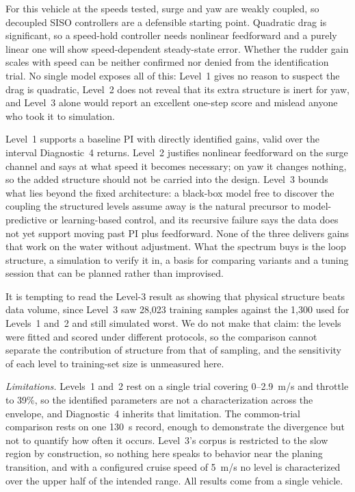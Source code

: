 \documentclass[conference]{IEEEtran}
\begin{document}
For this vehicle at the speeds tested, surge and yaw are weakly coupled, so decoupled SISO controllers are a defensible starting point. Quadratic drag is significant, so a speed-hold controller needs nonlinear feedforward and a purely linear one will show speed-dependent steady-state error. Whether the rudder gain scales with speed can be neither confirmed nor denied from the identification trial. No single model exposes all of this: Level~1 gives no reason to suspect the drag is quadratic, Level~2 does not reveal that its extra structure is inert for yaw, and Level~3 alone would report an excellent one-step score and mislead anyone who took it to simulation.

Level~1 supports a baseline PI with directly identified gains, valid over the interval Diagnostic~4 returns. Level~2 justifies nonlinear feedforward on the surge channel and says at what speed it becomes necessary; on yaw it changes nothing, so the added structure should not be carried into the design. Level~3 bounds what lies beyond the fixed architecture: a black-box model free to discover the coupling the structured levels assume away is the natural precursor to model-predictive or learning-based control, and its recursive failure says the data does not yet support moving past PI plus feedforward. None of the three delivers gains that work on the water without adjustment. What the spectrum buys is the loop structure, a simulation to verify it in, a basis for comparing variants and a tuning session that can be planned rather than improvised.

It is tempting to read the Level-3 result as showing that physical structure beats data volume, since Level~3 saw 28{,}023 training samples against the 1{,}300 used for Levels~1 and~2 and still simulated worst. We do not make that claim: the levels were fitted and scored under different protocols, so the comparison cannot separate the contribution of structure from that of sampling, and the sensitivity of each level to training-set size is unmeasured here.

\emph{Limitations.} Levels~1 and~2 rest on a single trial covering 0--2.9~m/s and throttle to 39\%, so the identified parameters are not a characterization across the envelope, and Diagnostic~4 inherits that limitation. The common-trial comparison rests on one 130~s record, enough to demonstrate the divergence but not to quantify how often it occurs. Level~3's corpus is restricted to the slow region by construction, so nothing here speaks to behavior near the planing transition, and with a configured cruise speed of 5~m/s no level is characterized over the upper half of the intended range. All results come from a single vehicle.
\end{document}
